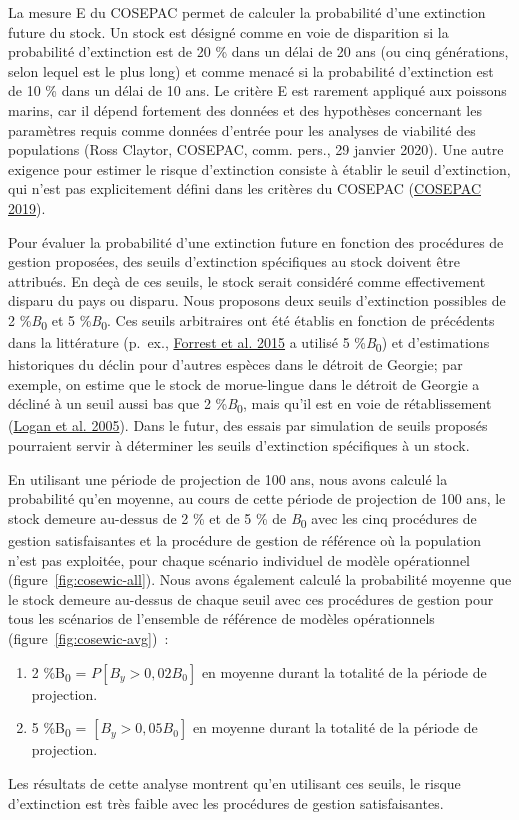 \documentclass[french,11pt]{book}
\begin{document}
La mesure E du COSEPAC permet de calculer la probabilité d'une extinction future du stock. Un stock est désigné comme en voie de disparition si la probabilité d'extinction est de 20 \% dans un délai de 20 ans (ou cinq générations, selon lequel est le plus long) et comme menacé si la probabilité d'extinction est de 10 \% dans un délai de 10 ans. Le critère E est rarement appliqué aux poissons marins, car il dépend fortement des données et des hypothèses concernant les paramètres requis comme données d'entrée pour les analyses de viabilité des populations (Ross Claytor, COSEPAC, comm. pers., 29 janvier 2020). Une autre exigence pour estimer le risque d'extinction consiste à établir le seuil d'extinction, qui n'est pas explicitement défini dans les critères du COSEPAC (\protect\hyperlink{ref-cosewic2015}{COSEPAC 2019}).

Pour évaluer la probabilité d'une extinction future en fonction des procédures de gestion proposées, des seuils d'extinction spécifiques au stock doivent être attribués. En deçà de ces seuils, le stock serait considéré comme effectivement disparu du pays ou disparu. Nous proposons deux seuils d'extinction possibles de 2 \%\emph{B}\textsubscript{0} et 5 \%\emph{B}\textsubscript{0}. Ces seuils arbitraires ont été établis en fonction de précédents dans la littérature (p.~ex., \protect\hyperlink{ref-forrest2015}{Forrest et al. 2015} a utilisé 5 \%\emph{B}\textsubscript{0}) et d'estimations historiques du déclin pour d'autres espèces dans le détroit de Georgie; par exemple, on estime que le stock de morue-lingue dans le détroit de Georgie a décliné à un seuil aussi bas que 2 \%\emph{B}\textsubscript{0}, mais qu'il est en voie de rétablissement (\protect\hyperlink{ref-logan2005}{Logan et al. 2005}). Dans le futur, des essais par simulation de seuils proposés pourraient servir à déterminer les seuils d'extinction spécifiques à un stock.

En utilisant une période de projection de 100 ans, nous avons calculé la probabilité qu'en moyenne, au cours de cette période de projection de 100 ans, le stock demeure au-dessus de 2 \% et de 5 \% de \emph{B}\textsubscript{0} avec les cinq procédures de gestion satisfaisantes et la procédure de gestion de référence où la population n'est pas exploitée, pour chaque scénario individuel de modèle opérationnel (figure~\ref{fig:cosewic-all}). Nous avons également calculé la probabilité moyenne que le stock demeure au-dessus de chaque seuil avec ces procédures de gestion pour tous les scénarios de l'ensemble de référence de modèles opérationnels (figure~\ref{fig:cosewic-avg})~:
\begin{enumerate}
\def\labelenumi{\arabic{enumi}.}

\item
  2 \%B\textsubscript{0} = \(P[B_y > 0,02 B_0]\) en moyenne durant la totalité de la période de projection.
\item
  5 \%B\textsubscript{0} = \([B_y > 0,05 B_0]\) en moyenne durant la totalité de la période de projection.
\end{enumerate}
Les résultats de cette analyse montrent qu'en utilisant ces seuils, le risque d'extinction est très faible avec les procédures de gestion satisfaisantes.
\end{document}
